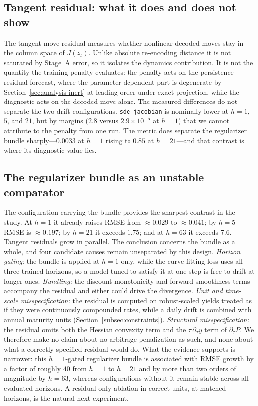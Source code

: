 \documentclass{article} %
\begin{document}
\subsection{Tangent residual: what it does and does not show}
\label{sec:analysis-tangent}
The tangent-move residual measures whether nonlinear decoded moves stay in the
column space of $J(z_t)$. Unlike absolute re-encoding distance it is not
saturated by Stage~A error, so it isolates the dynamics contribution. It is not the
quantity the training penalty evaluates: the penalty acts on the persistence-residual
forecast, where the parameter-dependent part is degenerate by
Section~\ref{sec:analysis-inert} at leading order under exact projection, while the
diagnostic acts on the decoded move alone.
The measured differences do not separate the two drift configurations.
\texttt{sde\allowbreak\_jacobian} is nominally lower at $h{=}1$, $5$, and $21$,
but by margins
($2.8$ versus $2.9\times10^{-5}$ at $h{=}1$) that we cannot attribute to the penalty
from one run. The metric does separate the regularizer bundle sharply---$0.0033$ at
$h{=}1$ rising to $0.85$ at $h{=}21$---and that contrast is where its diagnostic
value lies.
\subsection{The regularizer bundle as an unstable comparator}
\label{sec:analysis-pde}
The configuration carrying the bundle provides the sharpest contrast in the study. At
$h{=}1$ it already raises RMSE from $\approx0.029$ to $\approx0.041$; by $h{=}5$ RMSE
is $\approx0.197$; by $h{=}21$ it exceeds $1.75$; and at $h{=}63$ it exceeds $7.6$.
Tangent residuals grow in parallel.
The conclusion concerns the bundle as a whole, and four candidate causes remain
unseparated by this design. \emph{Horizon gating:} the bundle is applied at $h{=}1$
only, while the curve-fitting loss uses all three trained horizons, so a model tuned
to satisfy it at one step is free to drift at longer ones. \emph{Bundling:} the
discount-monotonicity and forward-smoothness terms accompany the residual and either
could drive the divergence. \emph{Unit and time-scale misspecification:} the
residual is computed on robust-scaled yields treated as if they were continuously
compounded rates, while a daily drift is combined with annual maturity units
(Section~\ref{subsec:constraints}). \emph{Structural misspecification:} the residual
omits both the Hessian convexity term and the $\tau\,\partial_\tau y$ term of
$\partial_\tau P$.
We therefore make no claim about no-arbitrage penalization as such, and none about
what a correctly specified residual would do. What the evidence supports is narrower:
this $h{=}1$-gated regularizer bundle is associated with RMSE growth by a factor of
roughly $40$ from $h{=}1$ to $h{=}21$ and by more than two orders of magnitude by
$h{=}63$, whereas configurations without it remain stable across all evaluated
horizons. A residual-only ablation in correct units, at matched horizons, is the
natural next experiment.
\end{document}
